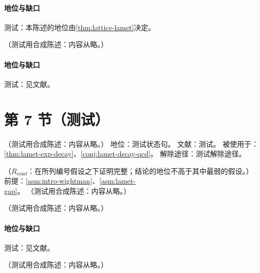 \paragraph{地位与缺口}测试：本陈述的地位由\cref{thm:lattice-lamet}决定。

\begin{remark}\label{rem:lamet-ratio-large-z}
（测试用合成陈述：内容从略。）
\end{remark}
\paragraph{地位与缺口}测试：见文献。

\section{第 7 节（测试）}\label{sec:lattice-matching}

\begin{assumption}\label{asm:lamet-gap}
（测试用合成陈述：内容从略。）
地位：测试状态句。
文献：测试。
被使用于：\cref{thm:lamet-exp-decay}、\cref{conj:lamet-decay-qcd}。
解除途径：测试解除途径。
\end{assumption}

\begin{theorem}\label{thm:lamet-exp-decay}
（$R_{\mathrm{cond}}$：在所列编号假设之下证明完整；结论的地位不高于其中最弱的假设。）
前提：\cref{asm:intro-wightman}、\cref{asm:lamet-gap}。
（测试用合成陈述：内容从略。）
\end{theorem}

\begin{conjecture}\label{conj:lamet-decay-qcd}
（测试用合成陈述：内容从略。）
\end{conjecture}
\paragraph{地位与缺口}测试：见文献。

\begin{lemma}\label{lem:lamet-strip}
（测试用合成陈述：内容从略。）
\end{lemma}

